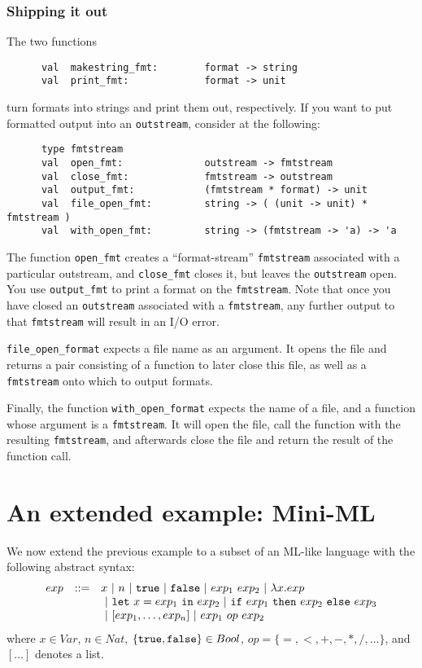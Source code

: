 \subsubsection{Shipping it out}
The two functions
\begin{verbatim}
      val  makestring_fmt:        format -> string
      val  print_fmt:             format -> unit
\end{verbatim}
turn formats into strings and print them out, respectively.
If you want to put formatted output into an {\tt outstream}, consider
at the following:
\begin{verbatim}
      type fmtstream
      val  open_fmt:              outstream -> fmtstream
      val  close_fmt:             fmtstream -> outstream
      val  output_fmt:            (fmtstream * format) -> unit
      val  file_open_fmt:         string -> ( (unit -> unit) * fmtstream )
      val  with_open_fmt:         string -> (fmtstream -> 'a) -> 'a
\end{verbatim}
The function {\tt open\_fmt} creates a ``format-stream'' {\tt fmtstream}
associated with a particular outstream,
and {\tt close\_fmt} closes it, but leaves the {\tt outstream} open.
You use {\tt output\_fmt} to print a format on the {\tt fmtstream}.
Note that once you have closed an {\tt outstream} associated with a
{\tt fmtstream}, any further output to that {\tt fmtstream} will result in
an I/O error.

{\tt file\_open\_format} expects a file name as an argument. It opens the
file and returns a pair consisting of a function to later close this file,
as well as a {\tt fmtstream} onto which to output formats.

Finally, the function {\tt with\_open\_format} expects the name of a file,
and a function whose argument is a {\tt fmtstream}. It will open the file, call
the function with the resulting {\tt fmtstream}, and afterwards close the
file and return the result of the function call.


\section{An extended example: Mini-ML}
We now extend the previous example to a subset of an ML-like language with the
following abstract syntax:
$$\begin{array}{lcl}
        exp & ::=  & x ~|~ n ~|~ {\tt true} ~|~ {\tt false}
                   ~|~ exp_1~exp_2 ~|~ \lambda x.exp\\
            & &  ~|~ {\tt let}~x=exp_1~{\tt in}~ exp_2
                 ~|~ {\tt if}~ exp_1 ~{\tt then}~ exp_2 ~{\tt else}~ exp_3\\
            & &  ~|~ [exp_1,\ldots,exp_n] ~|~  exp_1 ~op~ exp_2\\
    \end{array}
$$
where $x\in Var$, $n\in Nat$,
       $\{{\tt true}, {\tt false}\} \in Bool$,
        $op = \{ =, <, +, -, *, /, \ldots\}$, and $[\ldots]$ denotes a list.

